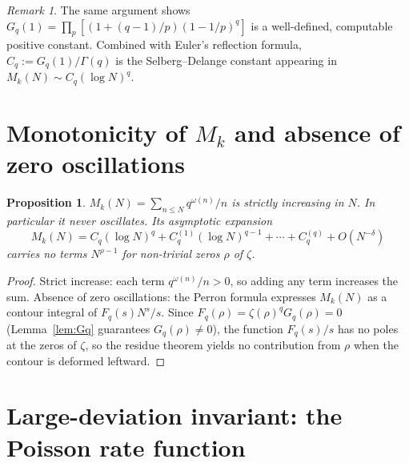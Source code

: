\documentclass[11pt]{amsart}
\newtheorem{proposition}[theorem]{Proposition}
\theoremstyle{definition}
\theoremstyle{remark}
\newtheorem{remark}[theorem]{Remark}
\newcommand{\om}{\omega}
\begin{document}
\begin{remark}
  The same argument shows $G_q(1) = \prod_p[(1+(q-1)/p)(1-1/p)^q]$ is a well-defined,
  computable positive constant.  Combined with Euler's reflection formula,
  $C_q := G_q(1)/\Gamma(q)$ is the Selberg--Delange constant appearing in
  $M_k(N)\sim C_q(\log N)^q$.
\end{remark}

\section{Monotonicity of $M_k$ and absence of zero oscillations}
\label{sec:Mk}

\begin{proposition}
  $M_k(N) = \sum_{n\le N}q^{\om(n)}/n$ is strictly increasing in $N$.
  In particular it never oscillates.  Its asymptotic expansion
  \[
    M_k(N) = C_q(\log N)^q + C_q^{(1)}(\log N)^{q-1} + \cdots + C_q^{(q)} + O(N^{-\delta})
  \]
  carries no terms $N^{\rho-1}$ for non-trivial zeros $\rho$ of $\zeta$.
\end{proposition}
\begin{proof}
  Strict increase: each term $q^{\om(n)}/n>0$, so adding any term increases the sum.
  Absence of zero oscillations: the Perron formula expresses $M_k(N)$ as a contour
  integral of $F_q(s)N^s/s$.  Since $F_q(\rho)=\zeta(\rho)^q G_q(\rho)=0$ (Lemma~\ref{lem:Gq}
  guarantees $G_q(\rho)\ne 0$), the function $F_q(s)/s$ has no poles at the zeros of
  $\zeta$, so the residue theorem yields no contribution from $\rho$ when the contour is
  deformed leftward.
\end{proof}

\section{Large-deviation invariant: the Poisson rate function}
\label{sec:LD}
\end{document}
